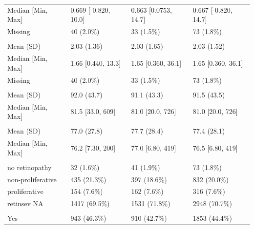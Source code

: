 \documentclass[
]{article}
\begin{document}
\begin{longtable}[t]{llll}
\hspace{1em}Median [Min, Max] & 0.669 [-0.820, 10.0] & 0.663 [0.0753, 14.7] & 0.667 [-0.820, 14.7]\\
\hspace{1em}Missing & 40 (2.0\%) & 33 (1.5\%) & 73 \vphantom{1} (1.8\%)\\
\addlinespace[0.3em]
\multicolumn{4}{l}{\textbf{TRIG1BL}}\\
\hspace{1em}Mean (SD) & 2.03 (1.36) & 2.03 (1.65) & 2.03 (1.52)\\
\hspace{1em}Median [Min, Max] & 1.66 [0.440, 13.3] & 1.65 [0.360, 36.1] & 1.65 [0.360, 36.1]\\
\hspace{1em}Missing & 40 (2.0\%) & 33 (1.5\%) & 73 (1.8\%)\\
\addlinespace[0.3em]
\multicolumn{4}{l}{\textbf{CREATBL}}\\
\hspace{1em}Mean (SD) & 92.0 (43.7) & 91.1 (43.3) & 91.5 (43.5)\\
\hspace{1em}Median [Min, Max] & 81.5 [33.0, 609] & 81.0 [20.0, 726] & 81.0 [20.0, 726]\\
\addlinespace[0.3em]
\multicolumn{4}{l}{\textbf{EGFMDRBC}}\\
\hspace{1em}Mean (SD) & 77.0 (27.8) & 77.7 (28.4) & 77.4 (28.1)\\
\hspace{1em}Median [Min, Max] & 76.2 [7.30, 200] & 77.0 [6.80, 419] & 76.5 [6.80, 419]\\
\addlinespace[0.3em]
\multicolumn{4}{l}{\textbf{RETINSEV}}\\
\hspace{1em}no retinopathy & 32 (1.6\%) & 41 (1.9\%) & 73 (1.8\%)\\
\hspace{1em}non-proliferative & 435 (21.3\%) & 397 (18.6\%) & 832 (20.0\%)\\
\hspace{1em}proliferative & 154 (7.6\%) & 162 (7.6\%) & 316 (7.6\%)\\
\hspace{1em}retinsev NA & 1417 (69.5\%) & 1531 (71.8\%) & 2948 (70.7\%)\\
\addlinespace[0.3em]
\multicolumn{4}{l}{\textbf{GERDBLFL}}\\
\hspace{1em}Yes & 943 (46.3\%) & 910 (42.7\%) & 1853 (44.4\%)\\

\end{longtable}
\end{document}
